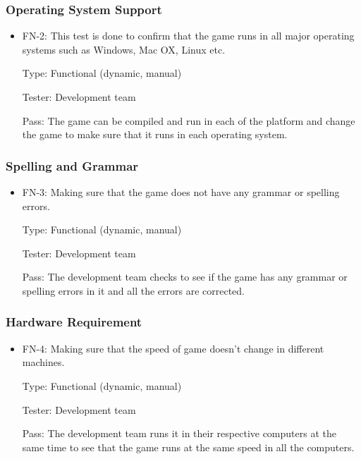 \documentclass[12pt,letterpaper]{article}
\begin{document}
	\subsubsection{Operating System Support}
\begin{reqbox}
	\begin{itemize}	
	\item FN-2: This test is done to confirm that the game runs in all major operating systems such as Windows, Mac OX, Linux etc. 

	Type: Functional (dynamic, manual)

	Tester: Development team
	
	Pass: The game can be compiled and run in each of the platform and change the game to make sure that it runs in each operating system.
	\end{itemize}
\end{reqbox}

	\subsubsection{Spelling and Grammar}
\begin{reqbox}
	\begin{itemize}
	\item FN-3: Making sure that the game does not have any grammar or spelling errors.

	Type: Functional (dynamic, manual)

	Tester: Development team

	Pass: The development team checks to see if the game has any grammar or spelling errors in it and all the errors are corrected.
	\end{itemize}
\end{reqbox}

	\subsubsection{Hardware Requirement}
\begin{reqbox}
	\begin{itemize}	
	\item FN-4: Making sure that the speed of game doesn’t change in different machines. 

	Type: Functional (dynamic, manual)
	
	Tester: Development team
	
	Pass: The development team runs it in their respective computers at the same time to see that the game runs at the same speed in all the computers.
	\end{itemize}
\end{reqbox}
\end{document}
